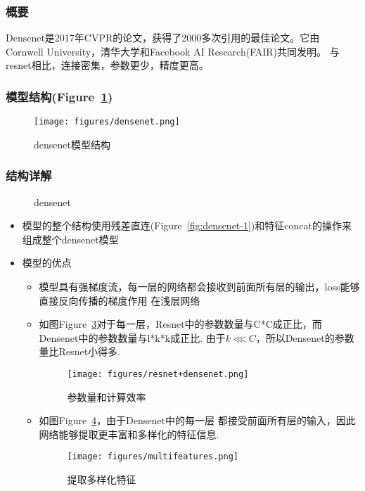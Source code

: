 \documentclass{article}
\begin{document}
\begin{CJK}{UTF8}{gbsn}
\subsubsection{概要}
Densenet是2017年CVPR的论文，获得了2000多次引用的最佳论文。它由
Cornwell University，清华大学和Facebook AI Research(FAIR)共同发明。
与resnet相比，连接密集，参数更少，精度更高。


\subsubsection{模型结构(Figure~\ref{fig:densenet})}
    \begin{figure}
        \centering
        \texttt{[image: figures/densenet.png]}
        \caption{densenet模型结构}
        \label{fig:densenet}
    \end{figure}


\subsubsection{结构详解}
    \begin{figure}[!ht] 
        \centering 
        \hfill 
        \caption{densenet} 
        \label{fig:densenet-0} 
    \end{figure}
    \begin{itemize}
        \item 模型的整个结构使用残差直连(Figure~\ref{fig:densenet-1})和特征concat的操作来组成整个densenet模型
        \item 模型的优点
        \begin{itemize}
            \item 模型具有强梯度流，每一层的网络都会接收到前面所有层的输出，loss能够直接反向传播的梯度作用
                    在浅层网络
            \item 如图Figure~\ref{fig:resnet+densenet}对于每一层，Resnet中的参数数量与C*C成正比，而Densenet中的参数数量与l*k*k成正比.
            由于$k \lll C$，所以Densenet的参数量比Resnet小得多.
            \begin{figure}
                \centering
                \texttt{[image: figures/resnet+densenet.png]}
                \caption{参数量和计算效率}
                \label{fig:resnet+densenet}
            \end{figure}
            \item 如图Figure~\ref{fig:multi-feature}，由于Densenet中的每一层
                都接受前面所有层的输入，因此网络能够提取更丰富和多样化的特征信息.
            \begin{figure}
                \centering
                \texttt{[image: figures/multifeatures.png]}
                \caption{提取多样化特征}
                \label{fig:multi-feature}
            \end{figure}
        \end{itemize}
    \end{itemize}



\end{CJK}
\end{document}
